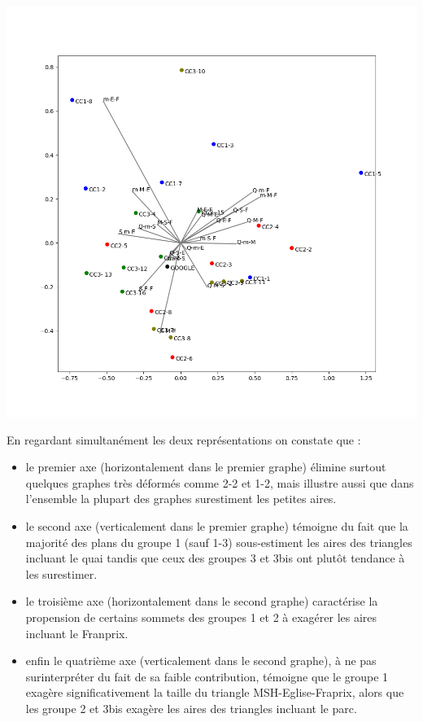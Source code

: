 \documentclass[a4paper]{article}
\begin{document}
\includegraphics[scale=0.6]{PCA_aires_axes2-3.png}

En regardant simultanément les deux représentations on constate que :
\begin{itemize}
	\item le premier axe (horizontalement dans le premier graphe) élimine surtout quelques graphes très déformés comme 2-2 et 1-2, mais illustre aussi que dans l'ensemble la plupart des graphes surestiment les petites aires.
	\item le second axe (verticalement dans le premier graphe) témoigne du fait que la majorité des plans du groupe 1 (sauf 1-3) sous-estiment les aires des triangles incluant le quai tandis que ceux des groupes 3 et 3bis ont plutôt tendance à les surestimer.
	\item le troisième axe (horizontalement dans le second graphe) caractérise la propension de certains sommets des groupes 1 et 2 à exagérer les aires incluant le Franprix.
	\item enfin le quatrième axe (verticalement dans le second graphe), à ne pas surinterpréter du fait de sa faible contribution, témoigne que le groupe 1 exagère significativement la taille du triangle MSH-Eglise-Fraprix, alors que les groupe 2 et 3bis exagère les aires des triangles incluant le parc.
\end{itemize}
\end{document}
